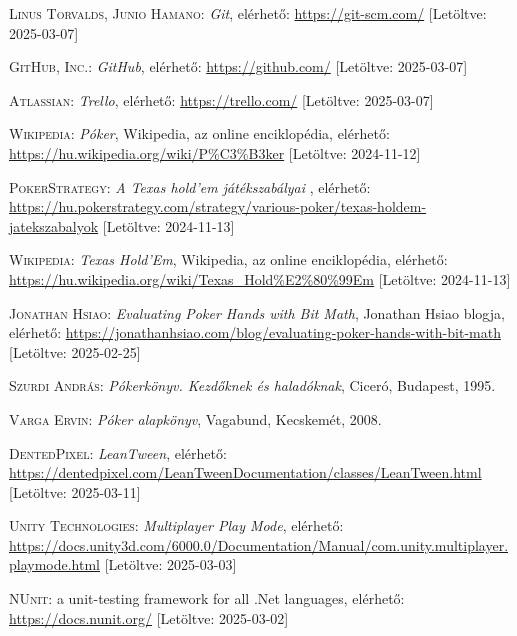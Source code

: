 \documentclass[]{thesis-ekf}
\theoremstyle{definition}
\theoremstyle{remark}
\begin{document}
\begin{thebibliography}{2}
	\textsc{Linus Torvalds, Junio Hamano}: \emph{Git}, elérhető:
	\url{https://git-scm.com/} [Letöltve: 2025-03-07]
	
	\textsc{GitHub, Inc.}: \emph{GitHub}, elérhető:
	\url{https://github.com/} [Letöltve: 2025-03-07]
	
	\textsc{Atlassian}: \emph{Trello}, elérhető:
	\url{https://trello.com/} [Letöltve: 2025-03-07]
	
	\textsc{Wikipedia}: \emph{Póker}, Wikipedia, az online enciklopédia, elérhető: \url{https://hu.wikipedia.org/wiki/P%C3%B3ker} [Letöltve: 2024-11-12]
	
	\textsc{PokerStrategy}: \emph{A Texas hold'em játékszabályai
	}, elérhető: \url{	https://hu.pokerstrategy.com/strategy/various-poker/texas-holdem-jatekszabalyok} [Letöltve: 2024-11-13]
	
	\textsc{Wikipedia}: \emph{Texas Hold'Em}, Wikipedia, az online enciklopédia, elérhető: \url{https://hu.wikipedia.org/wiki/Texas_Hold%E2%80%99Em} [Letöltve: 2024-11-13]
	
	\textsc{Jonathan Hsiao}: \emph{Evaluating Poker Hands with Bit Math}, Jonathan Hsiao blogja, elérhető: \url{https://jonathanhsiao.com/blog/evaluating-poker-hands-with-bit-math} [Letöltve: 2025-02-25]
	
	\textsc{Szurdi András}: \emph{Pókerkönyv. Kezdőknek és haladóknak}, Ciceró, Budapest, 1995.
	
	\textsc{Varga Ervin}: \emph{Póker alapkönyv}, Vagabund, Kecskemét, 2008.
	
	\textsc{DentedPixel}: \emph{LeanTween}, elérhető:
	\url{https://dentedpixel.com/LeanTweenDocumentation/classes/LeanTween.html} [Letöltve: 2025-03-11]
	
	\textsc{Unity Technologies}: \emph{Multiplayer Play Mode}, elérhető:
	\url{https://docs.unity3d.com/6000.0/Documentation/Manual/com.unity.multiplayer.playmode.html} [Letöltve: 2025-03-03]
	
	\textsc{NUnit}: a unit-testing framework for all .Net languages, elérhető: \url{https://docs.nunit.org/} [Letöltve: 2025-03-02]
	
\end{thebibliography}

%
\end{document}
